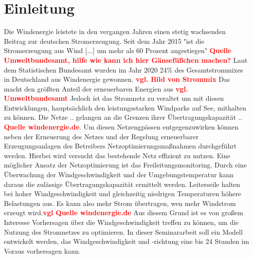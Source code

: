 \documentclass[
12pt, %
toc=listofnumbered, %
toc=chapterentrydotfill, %
numbers=noenddot, %
captions=tableheading, %
bibliography=numbered
]{scrreprt}
\newcommand{\highlight}[1]{\textbf{\textcolor{red}{#1}}}
\begin{document}
\tableofcontents
\chapter{Einleitung}

Die Windenergie leistete in den vergangen Jahren einen stetig wachsenden Beitrag zur deutschen Stromerzeugung. 
Seit dem Jahr 2015 "ist die Stromerzeugung aus Wind [...] um mehr als 60 Prozent angestiegen" \highlight{Quelle Umweltbundesamt, hilfe wie kann ich hier Gänsefüßchen machen?}
Laut dem Statistischen Bundesamt wurden im Jahr 2020 24\% des Gesamtstrommixes in Deutschland aus Windenergie gewonnen. \highlight{vgl. Bild von Strommix} 
Das macht den größten Anteil der erneuerbaren Energien aus \highlight{vgl. Umweltbundesamt}
Jedoch ist das Stromnetz zu veraltet um mit diesen Entwicklungen, hauptsächlich den leistungsstarken Windparks auf See, 
mithalten zu können. Die Netze .. gelangen an die Grenzen ihrer Übertragungskapazität .. \highlight{Quelle windenergie.de}. 
Um diesen Netzengpässen entgegenzuwirken können neben der Erneuerung des Netzes und der Regelung erneuerbarer Erzeugungsanlagen 
des Betreibers Netzoptimierungsmaßnahmen durchgeführt werden. Hierbei wird versucht das bestehende Netz effizient zu nutzen. 
Eine möglicher Ansatz der Netzoptimierung ist das Freileitungsmonitoring. 
Durch eine Überwachung der Windgeschwindigkeit und der Umgebungstemperatur kann daraus die zulässige Übertragungskapazität ermittelt werden. 
Leiterseile halten bei hoher Windgeschwindigkeit und gleichzeitig niedrigen Temperaturen höhere Belastungen aus. 
Es kann also mehr Strom übertragen, wen mehr Windstrom erzeugt wird.\highlight{vgl Quelle windenergie.de}
Aus diesem Grund ist es von großem Interesse Vorhersagen über die Windgeschwindigkeit treffen zu können, um 
die Nutzung des Stromnetzes zu optimieren. In dieser Seminararbeit soll ein Modell entwickelt werden, das 
Windgeschwindigkeit und -richtung eine bis 24 Stunden im Voraus vorhersagen kann.
\end{document}
